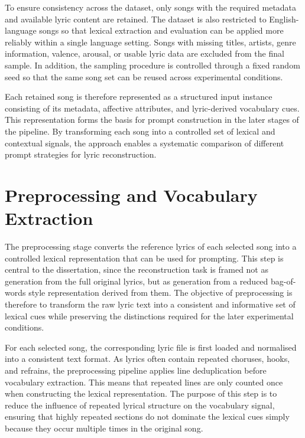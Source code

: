 To ensure consistency across the dataset, only songs with the required metadata and available lyric content are retained. The dataset is also restricted to English-language songs so that lexical extraction and evaluation can be applied more reliably within a single language setting. Songs with missing titles, artists, genre information, valence, arousal, or usable lyric data are excluded from the final sample. In addition, the sampling procedure is controlled through a fixed random seed so that the same song set can be reused across experimental conditions.

Each retained song is therefore represented as a structured input instance consisting of its metadata, affective attributes, and lyric-derived vocabulary cues. This representation forms the basis for prompt construction in the later stages of the pipeline. By transforming each song into a controlled set of lexical and contextual signals, the approach enables a systematic comparison of different prompt strategies for lyric reconstruction.

\section{Preprocessing and Vocabulary Extraction}

The preprocessing stage converts the reference lyrics of each selected song into a controlled lexical representation that can be used for prompting. This step is central to the dissertation, since the reconstruction task is framed not as generation from the full original lyrics, but as generation from a reduced bag-of-words style representation derived from them. The objective of preprocessing is therefore to transform the raw lyric text into a consistent and informative set of lexical cues while preserving the distinctions required for the later experimental conditions.

For each selected song, the corresponding lyric file is first loaded and normalised into a consistent text format. As lyrics often contain repeated choruses, hooks, and refrains, the preprocessing pipeline applies line deduplication before vocabulary extraction. This means that repeated lines are only counted once when constructing the lexical representation. The purpose of this step is to reduce the influence of repeated lyrical structure on the vocabulary signal, ensuring that highly repeated sections do not dominate the lexical cues simply because they occur multiple times in the original song.

